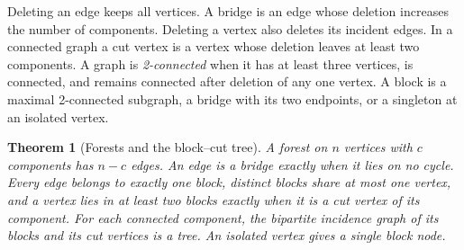 \documentclass[11pt,oneside,openany]{book}
\theoremstyle{plain}
\newtheorem{theorem}{Theorem}[chapter]
\theoremstyle{definition}
\theoremstyle{remark}
\begin{document}
Deleting an edge keeps all vertices. A bridge is an edge whose deletion
increases the number of components. Deleting a vertex also deletes its
incident edges. In a connected graph a cut vertex is a vertex whose
deletion leaves at least two components. A graph is \emph{2-connected}
when it has at least three vertices, is connected, and remains
connected after deletion of any one vertex. A block is a maximal
2-connected subgraph, a bridge with its two endpoints, or a singleton
at an isolated vertex.

\begin{theorem}[Forests and the block--cut tree]\label{p204:W38}
A forest on \(n\) vertices with \(c\) components has \(n-c\) edges.
An edge is a bridge exactly when it lies on no cycle. Every edge belongs
to exactly one block, distinct blocks share at most one vertex, and
a vertex lies in at least two blocks exactly when it is a cut vertex
of its component. For each connected component, the bipartite incidence
graph of its blocks and its cut vertices is a tree. An isolated vertex
gives a single block node.
\end{theorem}
\end{document}
